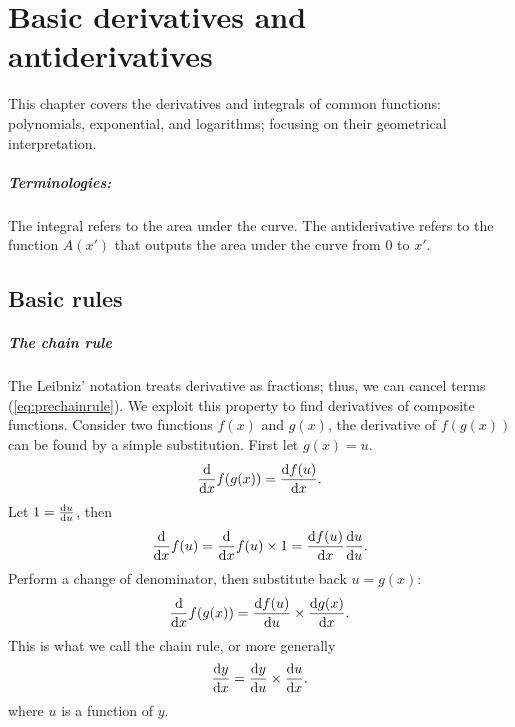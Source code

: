 \chapter{Basic derivatives and antiderivatives}
\label{sec:basic-derivatives-and-integrals}

This chapter covers the derivatives and integrals of common functions: polynomials, exponential, and logarithms; focusing on their geometrical interpretation.


\paragraph{Terminologies:} The integral refers to the area under the curve. The antiderivative refers to the function $A(x')$ that outputs the area under the curve from $0$ to $x'$.

\section{Basic rules}
\label{sec:trivial_rules}

\paragraph{The chain rule} The Leibniz' notation treats derivative as fractions; thus, we can cancel terms (\cref{eq:prechainrule}). We exploit this property to find derivatives of composite functions. Consider two functions $f(x)$ and $g(x)$, the derivative of $f(g(x))$ can be found by a simple substitution. First let $g(x) = u$.
\begin{equation*}
	\odv*{f(g(x))}{x} = \odv{f(u)}{x}.
\end{equation*}
Let $1 = \odv{u}{u}$, then
\begin{equation*}
	\odv*{f(u)}{x} = \odv*{f(u)}{x} \times 1 = \odv{f(u)}{x} \odv{u}{u}.
\end{equation*}
Perform a change of denominator, then substitute back $u = g(x)$:
\begin{equation*}
	\odv*{f(g(x))}{x} = \odv{f(u)}{u} \times \odv{g(x)}{x}.
\end{equation*}
This is what we call the chain rule, or more generally
\begin{equation}
    \odv{y}{x} = \odv{y}{u} \times \odv{u}{x}. \label{eq:chainrule}
\end{equation}
where $u$ is a function of $y$.

